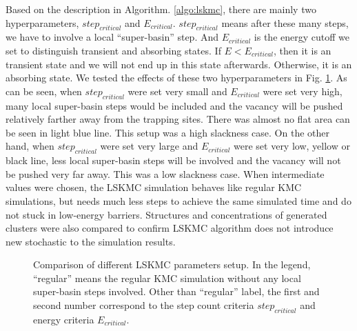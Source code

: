  
Based on the description in Algorithm. \ref{algo:lskmc}, there are mainly two hyperparameters, $step_{critical}$ and $E_{critical}$. $step_{critical}$ means after these many steps, we have to involve a local ``super-basin'' step. And $E_{critical}$ is the energy cutoff we set to distinguish transient and absorbing states. If $E < E_{critical}$, then it is an transient state and we will not end up in this state afterwards. Otherwise, it is an absorbing state. We tested the effects of these two hyperparameters in Fig. \ref{Chap:Al/Vac:fig:lskmc_time}. As can be seen, when $step_{critical}$ were set very small and $E_{critical}$ were set very high, many local super-basin steps would be included and the vacancy will be pushed relatively farther away from the trapping sites. There was almost no flat area can be seen in light blue line. This setup was a high slackness case. On the other hand, when $step_{critical}$ were set very large and $E_{critical}$ were set very low, yellow or black line, less local super-basin steps will be involved and the vacancy will not be pushed very far away. This was a low slackness case. When intermediate values were chosen, the \ac{LSKMC} simulation behaves like regular \ac{KMC} simulations, but needs much less steps to achieve the same simulated time and do not stuck in low-energy barriers.  Structures and concentrations of generated clusters were also compared to confirm \ac{LSKMC} algorithm does not introduce new stochastic to the simulation results.

\begingroup
\begin{figure}[!ht]
  \centering
\caption[Comparison of different \acf{LSKMC} parameters setup.]{Comparison of different \ac{LSKMC} parameters setup. In the legend, ``regular'' means the regular \ac{KMC} simulation without any local super-basin steps involved. Other than ``regular'' label, the first and second number correspond to the step count criteria $step_{critical}$ and energy criteria $E_{critical}$.}
\label{Chap:Al/Vac:fig:lskmc_time}
\end{figure}
\endgroup


